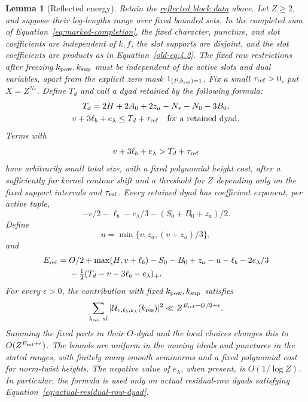 \documentclass[11pt,a4paper]{article}
\numberwithin{equation}{section}
\numberwithin{figure}{section}
\newtheorem{lemma}[theorem]{Lemma}
\theoremstyle{definition}
\theoremstyle{remark}
\begin{document}
\begin{lemma}[Reflected energy]\label{lem:reflected-energy}
Retain the \hyperref[par:reflected-energy-data]{reflected block data} above.
Let \(Z\ge2\), and suppose their log-lengths range over fixed bounded sets.
In the completed sum of Equation~\eqref{eq:marked-completion}, the fixed character,
puncture, and slot coefficients are independent of \(k,f\), the slot
supports are disjoint, and the slot coefficients are products as in
Equation~\eqref{old-eq:4.2}.  The fixed row restrictions after freezing
\(k_{\rm pow},k_{\rm sup}\) must be independent of the active slots and
dual variables, apart from the explicit zero mask
\(1_{(P,k_{\rm res})=1}\).  Fix a small \(\tau_{\rm ref}>0\), put
\(X=Z^{N_*}\).  Define \(T_d\) and call a dyad retained by the following
formula:
\begin{equation}\label{old-eq:4.4}
 \begin{gathered}
 T_d=2H+2A_0+2z_a-N_*-N_0-3B_0,\\
 v+3\ell_b+e_\lambda\le T_d+\tau_{\rm ref}
 \quad\text{for a retained dyad}.
 \end{gathered}
\end{equation}
Terms with
\[
 v+3\ell_b+e_\lambda>T_d+\tau_{\rm ref}
\]
have arbitrarily small total size, with a fixed polynomial height cost,
after a sufficiently far kernel contour shift and a threshold for \(Z\)
depending only on the fixed support intervals and \(\tau_{\rm ref}\).
Every retained dyad has coefficient exponent, per active
tuple,
\begin{equation}\label{old-eq:4.5}
 -v/2-\ell_b-e_\lambda/3-(S_0+B_0+z_a)/2.
\end{equation}
Define
\begin{equation}\label{old-eq:4.7}
 u=\min\{v,z_a,(v+z_a)/3\},
\end{equation}
and
\begin{equation}\label{old-eq:4.6}
 \begin{split}
 E_{\rm ref}={}&O/2+\max(H,v+\ell_b)-S_0-B_0+z_a-u-\ell_b
                     -2e_\lambda/3\\
 &-\tfrac12(T_d-v-3\ell_b-e_\lambda)_+.
 \end{split}
\end{equation}
For every \(\epsilon>0\), the contribution with fixed
\(k_{\rm pow},k_{\rm sup}\) satisfies
\[
 \sum_{k_{\rm res}\ {\rm sf}}
       |\mathcal U_{v,\ell_b,e_\lambda}(k_{\rm res})|^2
 \ll Z^{E_{\rm ref}-O/2+\epsilon}.
\]
Summing the fixed parts in their \(O\)-dyad and the local choices changes
this to \(O(Z^{E_{\rm ref}+\epsilon})\).  The bounds are uniform in the
moving ideals and punctures in the stated ranges, with finitely many
smooth seminorms and a fixed polynomial cost for norm-twist heights.
The negative value of \(e_\lambda\), when present, is
\(O(1/\log Z)\).  In particular, the formula is used only on actual
residual-row dyads satisfying Equation~\eqref{eq:actual-residual-row-dyad}.
\end{lemma}
\end{document}
